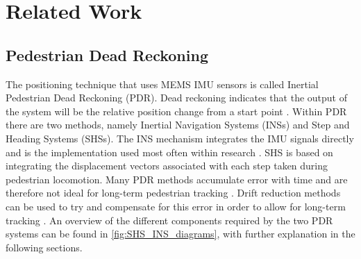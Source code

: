 \chapter{Related Work}




\section{Pedestrian Dead Reckoning}
The positioning technique that uses MEMS IMU sensors is called Inertial Pedestrian Dead Reckoning (PDR). Dead reckoning indicates that the output of the system will be the relative position change from a start point \cite{Yu2018}. Within PDR there are two methods, namely Inertial Navigation Systems (INSs) and Step and Heading Systems (SHSs). The INS mechanism integrates the IMU signals directly and is the implementation used most often within research \cite{Diez2018b}. SHS is based on integrating the displacement vectors associated with each step taken during pedestrian locomotion.  Many PDR methods accumulate error with time and are therefore not ideal for long-term pedestrian tracking \cite{Hardegger2012}. Drift reduction methods can be used to try and compensate for this error in order to allow for long-term tracking \cite{MunozDiaz2019a}.
An overview of the different components required by the two PDR systems can be found in \cref{fig:SHS_INS_diagrams}, with further explanation in the following sections.




